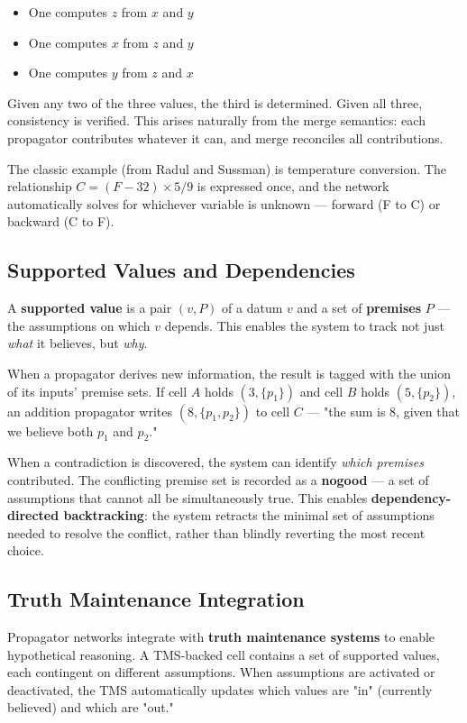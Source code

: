 \documentclass[11pt]{article}
\begin{document}
\begin{itemize}
\item One computes \(z\) from \(x\) and \(y\)
\item One computes \(x\) from \(z\) and \(y\)
\item One computes \(y\) from \(z\) and \(x\)
\end{itemize}

Given any two of the three values, the third is determined. Given all
three, consistency is verified. This arises naturally from the merge
semantics: each propagator contributes whatever it can, and merge
reconciles all contributions.

The classic example (from Radul and Sussman) is temperature conversion.
The relationship \(C = (F - 32) \times 5/9\) is expressed once, and the
network automatically solves for whichever variable is unknown ---
forward (F to C) or backward (C to F).
\subsection{Supported Values and Dependencies}
\label{sec:org6c85cbb}

A \textbf{supported value} is a pair \((v, P)\) of a datum \(v\) and a set of
\textbf{premises} \(P\) --- the assumptions on which \(v\) depends. This enables
the system to track not just \emph{what} it believes, but \emph{why}.

When a propagator derives new information, the result is tagged with the
union of its inputs' premise sets. If cell \(A\) holds \((3, \{p_1\})\) and
cell \(B\) holds \((5, \{p_2\})\), an addition propagator writes \((8,
\{p_1, p_2\})\) to cell \(C\) --- "the sum is 8, given that we believe both
\(p_1\) and \(p_2\)."

When a contradiction is discovered, the system can identify \emph{which
premises} contributed. The conflicting premise set is recorded as a
\textbf{nogood} --- a set of assumptions that cannot all be simultaneously true.
This enables \textbf{dependency-directed backtracking}: the system retracts the
minimal set of assumptions needed to resolve the conflict, rather than
blindly reverting the most recent choice.
\subsection{Truth Maintenance Integration}
\label{sec:org9c4b2c5}

Propagator networks integrate with \textbf{truth maintenance systems} to enable
hypothetical reasoning. A TMS-backed cell contains a set of supported
values, each contingent on different assumptions. When assumptions are
activated or deactivated, the TMS automatically updates which values are
"in" (currently believed) and which are "out."
\end{document}
